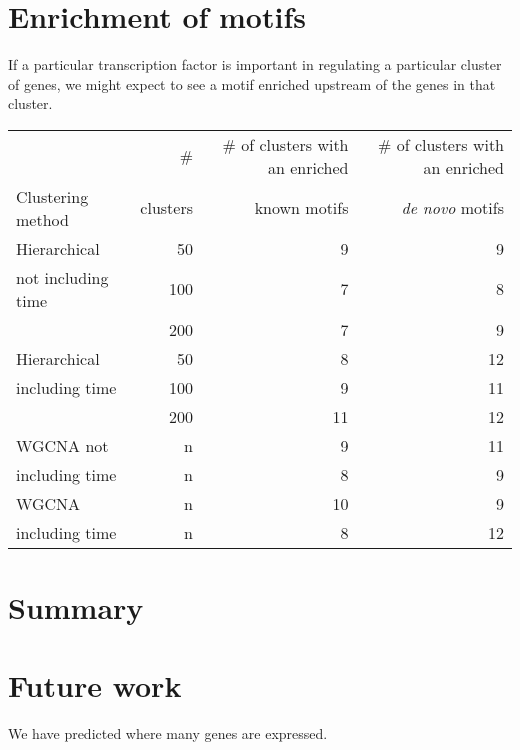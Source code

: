 \documentclass{article}
\begin{document}
\section*{Enrichment of motifs}

If a particular transcription factor is important in regulating
a particular cluster of genes, we might expect to see a motif
enriched upstream of the genes in that cluster.







\begin{center}
\begin{tabular}{lr|rr}
\hline
                 & \# & \# of clusters with an enriched & \# of clusters with an enriched \\
Clustering method & clusters & known motifs & {\em de novo} motifs \\
\hline
Hierarchical & 50 & 9 & 9 \\
not including time & 100 & 7 & 8 \\
            & 200 & 7 & 9 \\
\hline
Hierarchical & 50 & 8 & 12 \\
including time & 100 & 9 & 11 \\
  & 200 & 11 & 12 \\
\hline
WGCNA not & n & 9 & 11 \\
including time & n & 8 & 9 \\
\hline
WGCNA & n & 10 & 9 \\
including time & n & 8 & 12 \\
\hline
\end{tabular}
\end{center}

\section*{Summary}





\section*{Future work}

We have predicted where many genes are expressed.
\end{document}
